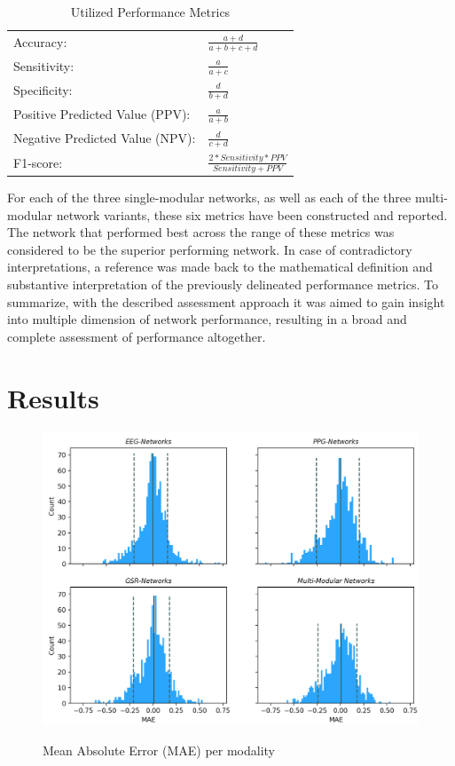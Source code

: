 \documentclass[12pt]{article}
\begin{document}
\bgroup
\def\arraystretch{1.8}%
\begin{table}[h]
\caption{Utilized Performance Metrics}
\label{table:metrics}
\begin{tabular}{ll}
\hline
Accuracy:                       & \(\frac{\!\!\!\!\!\!\!\!\!\!\!\!\!\!a+d}{a+b+c+d}\) \\
Sensitivity:                    & \(\frac{a}{a+c}\)                                   \\
Specificity:                    & \(\frac{d}{b+d}\)                                   \\
Positive Predicted Value (PPV): & \(\frac{a}{a+b}\)                                   \\
Negative Predicted Value (NPV):       & \(\frac{d}{c+d}\)                                   \\
F1-score:                     & \(\frac{2*Sensitivity*PPV}{Sensitivity+PPV}\)       \\ \hline
\end{tabular}
\end{table}
\egroup

For each of the three single-modular networks, as well as each of the three multi-modular network variants, these six metrics have been constructed and reported. The network that performed best across the range of these metrics was considered to be the superior performing network. In case of contradictory interpretations, a reference was made back to the mathematical definition and substantive interpretation of the previously delineated performance metrics. To summarize, with the described assessment approach it was aimed to gain insight into multiple dimension of network performance, resulting in a broad and complete assessment of performance altogether.     

\section{Results}

\begin{figure}
\caption{Mean Absolute Error (MAE) per modality}
\bigskip
\includegraphics[scale=0.67]{mae_hist.png}
\label{fig:mae_hist}
\end{figure}
\restoregeometry
\end{document}
